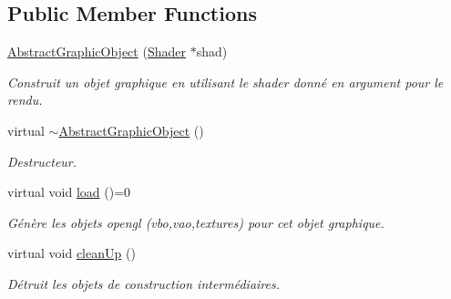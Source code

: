 \subsection*{Public Member Functions}
\begin{DoxyCompactItemize}
\item 
\hypertarget{classAbstractGraphicObject_ab1ddb96b82b01bba5e56e0917dceba0c}{\hyperlink{classAbstractGraphicObject_ab1ddb96b82b01bba5e56e0917dceba0c}{Abstract\-Graphic\-Object} (\hyperlink{classShader}{Shader} $\ast$shad)}\label{classAbstractGraphicObject_ab1ddb96b82b01bba5e56e0917dceba0c}

\begin{DoxyCompactList}\small\item\em Construit un objet graphique en utilisant le shader donné en argument pour le rendu. \end{DoxyCompactList}\item 
\hypertarget{classAbstractGraphicObject_aa20078bf878fc72814a44d5a986ec548}{virtual \hyperlink{classAbstractGraphicObject_aa20078bf878fc72814a44d5a986ec548}{$\sim$\-Abstract\-Graphic\-Object} ()}\label{classAbstractGraphicObject_aa20078bf878fc72814a44d5a986ec548}

\begin{DoxyCompactList}\small\item\em Destructeur. \end{DoxyCompactList}\item 
\hypertarget{classAbstractGraphicObject_ae0e201a972ea7e97b032bf21f75390a7}{virtual void \hyperlink{classAbstractGraphicObject_ae0e201a972ea7e97b032bf21f75390a7}{load} ()=0}\label{classAbstractGraphicObject_ae0e201a972ea7e97b032bf21f75390a7}

\begin{DoxyCompactList}\small\item\em Génère les objets opengl (vbo,vao,textures) pour cet objet graphique. \end{DoxyCompactList}\item 
\hypertarget{classAbstractGraphicObject_a69f33de948f6a754f6c345e5ad439e89}{virtual void \hyperlink{classAbstractGraphicObject_a69f33de948f6a754f6c345e5ad439e89}{clean\-Up} ()}\label{classAbstractGraphicObject_a69f33de948f6a754f6c345e5ad439e89}

\begin{DoxyCompactList}\small\item\em Détruit les objets de construction intermédiaires. \end{DoxyCompactList}\end{DoxyCompactItemize}

